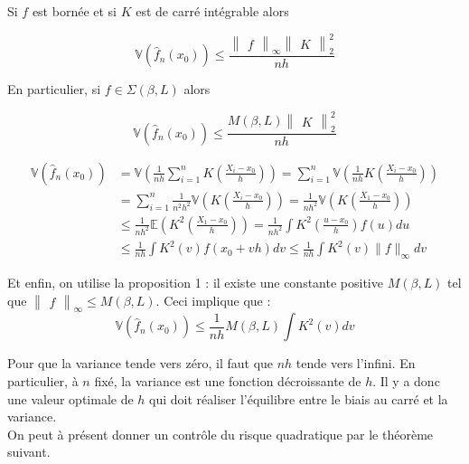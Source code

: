 \documentclass[
]{book}
\begin{document}
\begin{prop} Si $f$ est bornée et si $K$ est de carré intégrable alors 

$$
\mathbb{V}(\hat {f}_n(x_0)) \leqslant \frac{\begin{Vmatrix}f\end{Vmatrix}_{\infty}\begin{Vmatrix}K\end{Vmatrix}^2_2}{nh}
$$

En particulier, si $f \in \Sigma(\beta,L)$ alors

$$
\mathbb{V}(\hat {f}_n(x_0)) \leqslant \frac{M(\beta, L)\begin{Vmatrix}K\end{Vmatrix}^2_2}{nh}
$$

\end{prop}
\begin{demo}
$$
\begin{aligned}
\mathbb{V}\left(\hat {f}_n(x_0)\right) &= \mathbb{V}\left(\frac{1}{nh}\sum_{i=1}^nK\left(\frac{X_i-x_0}{h}\right)\right) 
=\sum_{i=1}^n\mathbb{V}\left(\frac{1}{nh}K\left(\frac{X_i-x_0}{h}\right)\right) \\
&=\sum_{i=1}^n\frac{1}{n^2h^2}\mathbb{V}\left(K\left(\frac{X_i-x_0}{h}\right)\right) 
=\frac{1}{nh^2}\mathbb{V}\left(K\left(\frac{X_1-x_0}{h}\right)\right) \\
&\leqslant \frac{1}{nh^2}\mathbb{E}\left(K^2\left(\frac{X_1-x_0}{h}\right)\right) 
=\frac{1}{nh^2}\int K^2\left(\frac{u-x_0}{h}\right)f(u)du \\
&\leqslant\frac{1}{nh}\int K^2(v)f(x_0 +vh)dv \leqslant\frac{1}{nh}\int K^2(v)\parallel f \parallel_\infty dv
\end{aligned}
$$ 

Et enfin, on utilise la proposition 1 : il existe une constante positive $M(\beta,L)$ tel que $\begin{Vmatrix}f\end{Vmatrix}_{\infty} \leqslant M(\beta, L)$. Ceci implique que :
$$
 \mathbb{V}(\hat {f}_n(x_0))\leqslant\frac{1}{nh}M(\beta, L)\int K^2(v)dv 
$$ 
 \end{demo}

Pour que la variance tende vers zéro, il faut que \(nh\) tende vers l'infini. En particulier, à \(n\) fixé, la variance est une fonction décroissante de \(h\). Il y a donc une valeur optimale de \(h\) qui doit réaliser l'équilibre entre le biais au carré et la variance.\\
On peut à présent donner un contrôle du risque quadratique par le théorème suivant.\\
\end{document}
